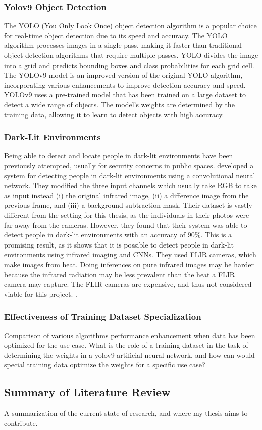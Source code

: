 \subsubsection{Yolov9 Object Detection}
The YOLO (You Only Look Once) object detection algorithm is a popular choice for real-time object detection due to its speed and accuracy. The YOLO algorithm processes images in a single pass, making it faster than traditional object detection algorithms that require multiple passes. YOLO divides the image into a grid and predicts bounding boxes and class probabilities for each grid cell. The YOLOv9 model is an improved version of the original YOLO algorithm, incorporating various enhancements to improve detection accuracy and speed. YOLOv9 uses a pre-trained model that has been trained on a large dataset to detect a wide range of objects. The model's weights are determined by the training data, allowing it to learn to detect objects with high accuracy.





\subsubsection{Dark-Lit Environments}
Being able to detect and locate people in dark-lit environments have been previously attempted, usually for security concerns in public spaces. \citeauthor{pa2020PersonDetectionNightTimeFLIR} developed a system for detecting people in dark-lit environments using a convolutional neural network. They modified the three input channels which usually take RGB to take as input instead (i) the original infrared image, (ii) a difference image from the previous frame, and (iii) a background subtraction mask. Their dataset is vastly different from the setting for this thesis, as the individuals in their photos were far away from the cameras. However, they found that their system was able to detect people in dark-lit environments with an accuracy of 90\%. This is a promising result, as it shows that it is possible to detect people in dark-lit environments using infrared imaging and CNNs. They used FLIR cameras, which make images from heat. Doing inferences on pure infrared images may be harder because the infrared radiation may be less prevalent than the heat a FLIR camera may capture. The FLIR cameras are expensive, and thus not considered viable for this project. 
\cite{pa2020PersonDetectionNightTimeFLIR}. 




\subsubsection{Effectiveness of Training Dataset Specialization}
\label{sec:dataset_specialization}
Comparison of various algorithms performance enhancement when data has been optimized for the use case. What is the role of a training dataset in the task of determining the weights in a yolov9 artificial neural network, and how can would special training data optimize the weights for a specific use case?



\subsection{Summary of Literature Review}
A summarization of the current state of research, and where my thesis aims to contribute.
